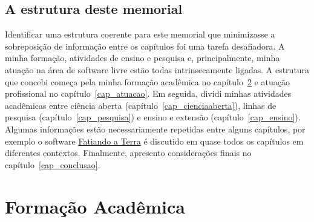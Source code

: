 \documentclass[10pt,a4paper,oneside]{book}
\begin{document}
\section{A estrutura deste memorial}

Identificar uma estrutura coerente  para este memorial que minimizasse a
sobreposição de informação entre os capítulos foi uma tarefa desafiadora.
A minha formação, atividades de ensino e pesquisa e, principalmente, minha
atuação na área de software livre estão todas intrinsecamente ligadas.
A estrutura que concebi começa pela minha formação acadêmica no
capítulo~\ref{cap_formacao} e atuação profissional no
capítulo~\ref{cap_atuacao}.
Em seguida, dividi minhas atividades acadêmicas
entre ciência aberta (capítulo~\ref{cap_cienciaaberta}),
linhas de pesquisa (capítulo~\ref{cap_pesquisa})
e ensino e extensão (capítulo~\ref{cap_ensino}).
Algumas informações estão necessariamente repetidas entre alguns capítulos,
por exemplo o software \href{https://www.fatiando.org}{Fatiando a Terra}
é discutido em quase todos os capítulos em diferentes contextos.
Finalmente, apresento considerações finais no capítulo~\ref{cap_conclusao}.


\chapter{Formação Acadêmica}
\label{cap_formacao}
\end{document}

